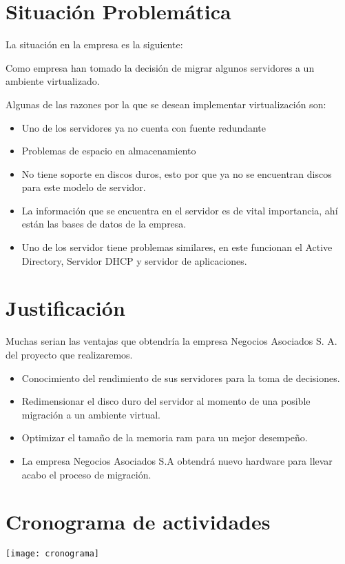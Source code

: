 \pagebreak

\section{Situación Problemática}

La situación en la empresa es la siguiente:

Como empresa han tomado la decisión de migrar algunos servidores a un ambiente virtualizado.

Algunas de las razones por la que se desean implementar virtualización son:

\begin{itemize}
\item Uno de los servidores ya no cuenta con fuente redundante
\item Problemas de espacio en almacenamiento
\item No tiene soporte en discos duros, esto por que ya no se encuentran discos para este modelo de servidor.
\item La información que se encuentra en el servidor es de vital importancia, ahí están las bases de datos de la empresa.
\item Uno de los servidor tiene problemas similares, en este funcionan el
  Active Directory, Servidor DHCP y servidor de aplicaciones.
\end{itemize}

\section{Justificación}

Muchas serian las ventajas que obtendría la empresa Negocios Asociados S. A. del proyecto que realizaremos.

\begin{itemize}
\item Conocimiento del rendimiento de sus servidores para la toma de decisiones.
\item Redimensionar el disco duro del servidor al momento de una posible migración a un ambiente virtual.
\item Optimizar el tamaño de la memoria ram para un mejor desempeño.
\item La empresa Negocios Asociados S.A obtendrá nuevo hardware para llevar acabo el proceso de migración.
\end{itemize}

\clearpage

\section{Cronograma de actividades}

\texttt{[image: cronograma]}





